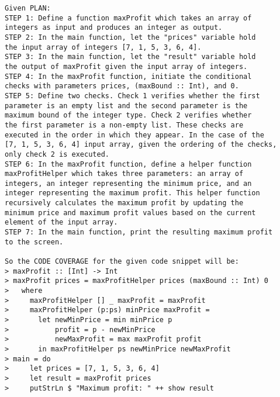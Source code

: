 \documentclass[sigconf]{acmart}
\begin{document}
\begin{verbatim}
Given PLAN:
STEP 1: Define a function maxProfit which takes an array of
integers as input and produces an integer as output.
STEP 2: In the main function, let the "prices" variable hold
the input array of integers [7, 1, 5, 3, 6, 4].
STEP 3: In the main function, let the "result" variable hold
the output of maxProfit given the input array of integers.
STEP 4: In the maxProfit function, initiate the conditional
checks with parameters prices, (maxBound :: Int), and 0.
STEP 5: Define two checks. Check 1 verifies whether the first
parameter is an empty list and the second parameter is the
maximum bound of the integer type. Check 2 verifies whether
the first parameter is a non-empty list. These checks are
executed in the order in which they appear. In the case of the
[7, 1, 5, 3, 6, 4] input array, given the ordering of the checks,
only check 2 is executed.
STEP 6: In the maxProfit function, define a helper function
maxProfitHelper which takes three parameters: an array of
integers, an integer representing the minimum price, and an
integer representing the maximum profit. This helper function
recursively calculates the maximum profit by updating the
minimum price and maximum profit values based on the current
element of the input array.
STEP 7: In the main function, print the resulting maximum profit
to the screen.

So the CODE COVERAGE for the given code snippet will be: 
> maxProfit :: [Int] -> Int
> maxProfit prices = maxProfitHelper prices (maxBound :: Int) 0
>   where
>     maxProfitHelper [] _ maxProfit = maxProfit
>     maxProfitHelper (p:ps) minPrice maxProfit =
>       let newMinPrice = min minPrice p
>           profit = p - newMinPrice
>           newMaxProfit = max maxProfit profit
>       in maxProfitHelper ps newMinPrice newMaxProfit
> main = do
>     let prices = [7, 1, 5, 3, 6, 4]
>     let result = maxProfit prices
>     putStrLn $ "Maximum profit: " ++ show result
\end{verbatim}
\end{document}
